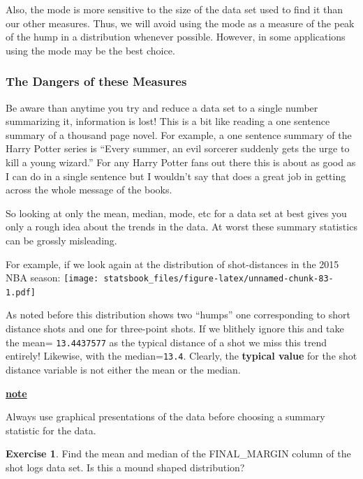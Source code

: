\documentclass[
]{book}
\newenvironment{rmdblock}[1]
  {\begin{shaded*}
  \centerline{\underline{\textbf{#1}}}

  }
  {
  \end{shaded*}
  }
\newenvironment{note}
  {\begin{rmdblock}{note}}
  {\end{rmdblock}}
\theoremstyle{definition}
\theoremstyle{definition}
\theoremstyle{definition}
\newtheorem{exercise}{Exercise}[chapter]
\theoremstyle{definition}
\theoremstyle{remark}
\begin{document}
Also, the mode is more sensitive to the size of the data set used to find it than our other measures. Thus, we will avoid using the mode as a measure of the peak of the hump in a distribution whenever possible. However, in some applications using the mode may be the best choice.

\hypertarget{the-dangers-of-these-measures}{%
\subsubsection{The Dangers of these Measures}\label{the-dangers-of-these-measures}}

Be aware than anytime you try and reduce a data set to a single number summarizing it, information is lost! This is a bit like reading a one sentence summary of a thousand page novel. For example, a one sentence summary of the Harry Potter series is ``Every summer, an evil sorcerer suddenly gets the urge to kill a young wizard.'' For any Harry Potter fans out there this is about as good as I can do in a single sentence but I wouldn't say that does a great job in getting across the whole message of the books.

So looking at only the mean, median, mode, etc for a data set at best gives you only a rough idea about the trends in the data. At worst these summary statistics can be grossly misleading.

For example, if we look again at the distribution of shot-distances in the 2015 NBA season:
\texttt{[image: statsbook\_files/figure-latex/unnamed-chunk-83-1.pdf]}

As noted before this distribution shows two ``humps'' one corresponding to short distance shots and one for three-point shots. If we blithely ignore this and take the mean= \texttt{13.4437577} as the typical distance of a shot we miss this trend entirely! Likewise, with the median=\texttt{13.4}. Clearly, the \textbf{typical value} for the shot distance variable is not either the mean or the median.

\begin{note}
Always use graphical presentations of the data before choosing a summary statistic for the data.
\end{note}

\begin{exercise}
\protect\hypertarget{exr:unnamed-chunk-85}{}\label{exr:unnamed-chunk-85}Find the mean and median of the FINAL\_MARGIN column of the shot logs data set. Is this a mound shaped distribution?
\end{exercise}
\end{document}

